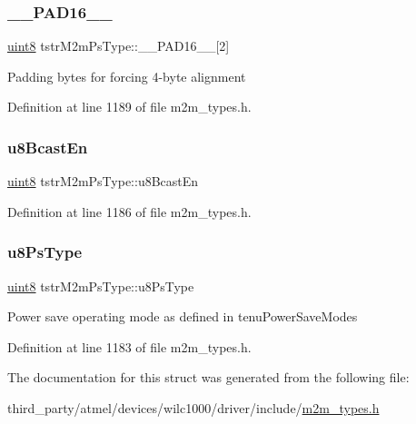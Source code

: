 \subsubsection{\texorpdfstring{\+\_\+\+\_\+\+P\+A\+D16\+\_\+\+\_\+}{\_\_PAD16\_\_}}
{\footnotesize\ttfamily \hyperlink{group__DataT_ga4df709a77647e870bbf1d955b8edc9a6}{uint8} tstr\+M2m\+Ps\+Type\+::\+\_\+\+\_\+\+P\+A\+D16\+\_\+\+\_\+\mbox{[}2\mbox{]}}

Padding bytes for forcing 4-\/byte alignment 

Definition at line 1189 of file m2m\+\_\+types.\+h.

\mbox{\label{structtstrM2mPsType_a86e703a96c3ff79176b783f3afa96f9e}} 
\subsubsection{\texorpdfstring{u8\+Bcast\+En}{u8BcastEn}}
{\footnotesize\ttfamily \hyperlink{group__DataT_ga4df709a77647e870bbf1d955b8edc9a6}{uint8} tstr\+M2m\+Ps\+Type\+::u8\+Bcast\+En}



Definition at line 1186 of file m2m\+\_\+types.\+h.

\mbox{\label{structtstrM2mPsType_a3e06c6db1c8e30972e3666adcc2324e7}} 
\subsubsection{\texorpdfstring{u8\+Ps\+Type}{u8PsType}}
{\footnotesize\ttfamily \hyperlink{group__DataT_ga4df709a77647e870bbf1d955b8edc9a6}{uint8} tstr\+M2m\+Ps\+Type\+::u8\+Ps\+Type}

Power save operating mode as defined in tenu\+Power\+Save\+Modes 

Definition at line 1183 of file m2m\+\_\+types.\+h.



The documentation for this struct was generated from the following file\+:\begin{DoxyCompactItemize}
\item 
third\+\_\+party/atmel/devices/wilc1000/driver/include/\hyperlink{m2m__types_8h}{m2m\+\_\+types.\+h}\end{DoxyCompactItemize}
